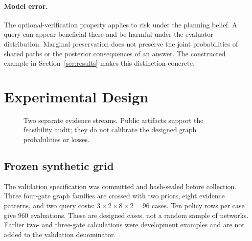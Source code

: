 \documentclass[manuscript,screen,nonacm]{acmart}
\begin{document}
\paragraph{Model error.} The optional-verification property applies to risk under the planning belief. A query can appear beneficial there and be harmful under the evaluator distribution. Marginal preservation does not preserve the joint probabilities of shared paths or the posterior consequences of an answer. The constructed example in Section~\ref{sec:results} makes this distinction concrete.

\section{Experimental Design}
\begin{figure}[t]
\centering
{}
\caption{Two separate evidence streams. Public artifacts support the feasibility audit; they do not calibrate the designed graph probabilities or losses.}
\end{figure}
\subsection{Frozen synthetic grid}
The validation specification was committed and hash-sealed before collection. Three four-gate graph families are crossed with two priors, eight evidence patterns, and two query costs: $3\times2\times8\times2=96$ cases. Ten policy rows per case give 960 evaluations. These are designed cases, not a random sample of networks. Earlier two- and three-gate calculations were development examples and are not added to the validation denominator.
\end{document}
